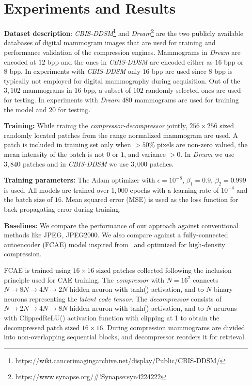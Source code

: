 \documentclass[10pt,twocolumn,letterpaper]{article}
\begin{document}
\section{Experiments and Results}

\textbf{Dataset description}: \emph{CBIS-DDSM}\footnote{https://wiki.cancerimagingarchive.net/display/Public/CBIS-DDSM/} and \emph{Dream}\footnote{https://www.synapse.org/\#!Synapse:syn4224222} are the two publicly available databases of digital mammogram images that are used for training and performance validation of the compression engines. Mammograms in \emph{Dream} are encoded at $12$ bpp and the ones in \emph{CBIS-DDSM} are encoded either as $16$ bpp or $8$ bpp. In experiments with \emph{CBIS-DDSM} only $16$ bpp are used since $8$ bpp is typically not employed for digital mammography during acquisition. Out of the $3,102$ mammograms in $16$ bpp, a subset of $102$ randomly selected ones are used for testing. In experiments with \emph{Dream} $480$ mammograms are used for training the model and $20$ for testing.

\textbf{Training:} While trainig the \emph{compressor-decompressor} jointly, $256\times256$ sized randomly located patches from the range normalized mammogram are used. A patch is included in training set only when $>50\%$ pixels are non-zero valued, the mean intensity of the patch is not $0$ or $1$, and variance $>0$. In \emph{Dream} we use $3,840$ patches and in \emph{CBIS-DDSM} we use $3,000$ patches.

\textbf{Training parameters:} The Adam optimizer \cite{kingma2014adam} with $\epsilon = 10^{-8}$, $\beta_{1} = 0.9$, $\beta_{2} = 0.999$ is used. All models are trained over $1,000$ epochs with a learning rate of $10^{-4}$ and the batch size of $16$. Mean squared error (MSE) is used as the loss function for back propagating error during training.

\textbf{Baselines:} We compare the performance of our approach against conventional methods like JPEG, JPEG2000. We also compare against a fully-connected autoencoder (FCAE) model inspired from~\cite{tan2011using} and optimized for high-density compression. 

FCAE is trained using $16\times16$ sized patches collected following the inclusion principle used for CAE training. The \emph{compressor} with $N=16^2$ connects $N\rightarrow 8N \rightarrow 4N \rightarrow 2N$ hidden neuron with tanh() activation, and to $N$ binary neurons representing the \emph{latent code tensor}. The \emph{decompressor} consists of $N \rightarrow 2N \rightarrow 4N \rightarrow 8N$ hidden neuron with tanh() activation, and to $N$ neurons with ClippedReLU() activation function with clipping at 1 to obtain the decompressed patch sized $16 \times 16$. During compression mammograms are divided into non-overlapping sequential blocks, and decompressor reorders it for retrieval.
\end{document}
